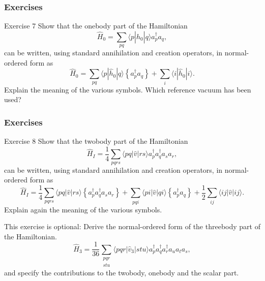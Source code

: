 \documentclass{beamer}
\begin{document}
\begin{frame}
\frametitle{Exercises}

\begin{block}{Exercise 7 }
Show that the onebody part of the Hamiltonian
\[	     
\hat{H}_0 = \sum_{pq} \langle p|\hat{h}_0|q\rangle a^{\dagger}_p a_q,
\]
can be written, using standard annihilation and creation operators, in normal-ordered form as 
\[
\hat{H}_0 = \sum_{pq} \langle p|\hat{h}_0|q\rangle \left\{a^\dagger_p a_q\right\} +
             \sum_i \langle i|\hat{h}_0|i\rangle.
\]
Explain the meaning of the various symbols. Which reference 
vacuum has been used?
\end{block}
\end{frame}

\begin{frame}
\frametitle{Exercises}

\begin{block}{Exercise 8 }
Show that the twobody part of the Hamiltonian
\[
  \hat{H}_I = \frac{1}{4} \sum_{pqrs} \langle pq|\hat{v}|rs\rangle a^\dagger_p a^\dagger_q a_s  a_r,
\]
can be written, using standard annihilation and creation operators, in normal-ordered form as 
\[
\hat{H}_I =\frac{1}{4} \sum_{pqrs} \langle pq|\hat{v}|rs\rangle \left\{a^\dagger_p a^\dagger_q a_s  a_r\right\}
            + \sum_{pqi} \langle pi|\hat{v}|qi\rangle \left\{a^\dagger_p a_q\right\} 
            + \frac{1}{2} \sum_{ij}\langle ij|\hat{v}|ij\rangle.
\]
Explain again the meaning of the various symbols.

This exercise is optional: Derive the normal-ordered form of the threebody part of the Hamiltonian.
\[
\hat{H}_3 = \frac{1}{36} \sum_{\substack{pqr \\ stu}}
                 \langle pqr|\hat{v}_3|stu\rangle a^\dagger_p a^\dagger_q a^\dagger_r a_u a_t a_s,
\]
and specify the contributions to the twobody, onebody and the scalar part.
\end{block}
\end{frame}
\end{document}

